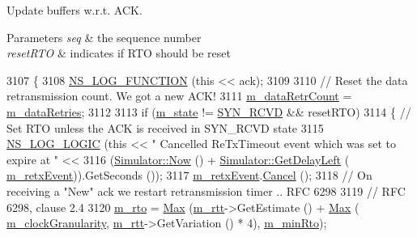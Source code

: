 Update buffers w.\+r.\+t. A\+CK. 


\begin{DoxyParams}{Parameters}
{\em seq} & the sequence number \\
\hline
{\em reset\+R\+TO} & indicates if R\+TO should be reset \\
\hline
\end{DoxyParams}

\begin{DoxyCode}
3107 \{
3108   \hyperlink{log-macros-disabled_8h_a90b90d5bad1f39cb1b64923ea94c0761}{NS\_LOG\_FUNCTION} (\textcolor{keyword}{this} << ack);
3109 
3110   \textcolor{comment}{// Reset the data retransmission count. We got a new ACK!}
3111   \hyperlink{classns3_1_1TcpSocketBase_ace7efd32ba5d109037ddd08e128d589d}{m\_dataRetrCount} = \hyperlink{classns3_1_1TcpSocketBase_a65d99ef317bd43d9f8a58a34c8fe5faa}{m\_dataRetries};
3112 
3113   \textcolor{keywordflow}{if} (\hyperlink{classns3_1_1TcpSocketBase_a5db6f29272f23546e23320c06a681f3e}{m\_state} != \hyperlink{group__tcp_gga3929cdb47bdf159657fa24054aa5ca03abdb50eab9f592a17a412a62deddde11a}{SYN\_RCVD} && resetRTO)
3114     \{ \textcolor{comment}{// Set RTO unless the ACK is received in SYN\_RCVD state}
3115       \hyperlink{group__logging_ga88acd260151caf2db9c0fc84997f45ce}{NS\_LOG\_LOGIC} (\textcolor{keyword}{this} << \textcolor{stringliteral}{" Cancelled ReTxTimeout event which was set to expire at "} <<
3116                     (\hyperlink{classns3_1_1Simulator_ac3178fa975b419f7875e7105be122800}{Simulator::Now} () + \hyperlink{classns3_1_1Simulator_af2c7b4285454aa5062bd2df2bb7a7ab9}{Simulator::GetDelayLeft} (
      \hyperlink{classns3_1_1TcpSocketBase_a620dd547e6484bc03c6b796f589b75a6}{m\_retxEvent})).GetSeconds ());
3117       \hyperlink{classns3_1_1TcpSocketBase_a620dd547e6484bc03c6b796f589b75a6}{m\_retxEvent}.\hyperlink{classns3_1_1EventId_a993ae94e48e014e1afd47edb16db7a11}{Cancel} ();
3118       \textcolor{comment}{// On receiving a "New" ack we restart retransmission timer .. RFC 6298}
3119       \textcolor{comment}{// RFC 6298, clause 2.4}
3120       \hyperlink{classns3_1_1TcpSocketBase_a47788384a59ae230896377ceab6829d4}{m\_rto} = \hyperlink{group__highprec_ga0d35bb9363c0da4cc2557158b95dbca0}{Max} (\hyperlink{classns3_1_1TcpSocketBase_a5fc75bf06fd5382244cf1d60652cf58d}{m\_rtt}->GetEstimate () + \hyperlink{group__highprec_ga0d35bb9363c0da4cc2557158b95dbca0}{Max} (
      \hyperlink{classns3_1_1TcpSocketBase_a92035196e6807e1430369bdfdead2e46}{m\_clockGranularity}, \hyperlink{classns3_1_1TcpSocketBase_a5fc75bf06fd5382244cf1d60652cf58d}{m\_rtt}->GetVariation () * 4), \hyperlink{classns3_1_1TcpSocketBase_a0e95a7381ca2a157516e7f2e86455922}{m\_minRto});

\end{DoxyCode}
